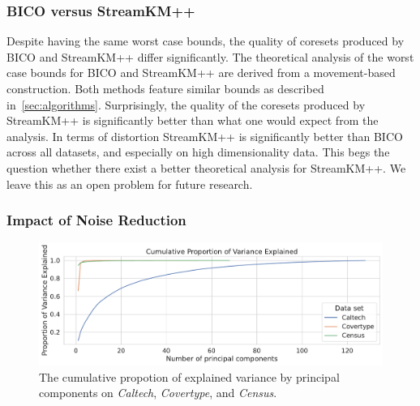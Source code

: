 \subsubsection*{BICO versus StreamKM++}
Despite having the same worst case bounds, the quality of coresets produced by BICO and StreamKM++ differ significantly.
The theoretical analysis of the worst case bounds for BICO and StreamKM++ are derived from a movement-based construction. Both methods feature similar bounds as described in~\cref{sec:algorithms}. Surprisingly, the quality of the coresets produced by StreamKM++ is significantly better than what one would expect from the analysis. In terms of distortion StreamKM++ is significantly better than BICO across all datasets, and especially on high dimensionality data. This begs the question whether there exist a better theoretical analysis for StreamKM++. We leave this as an open problem for future research.



\subsubsection*{Impact of Noise Reduction}

\begin{figure}
  \caption{The cumulative propotion of explained variance by principal components on \textit{Caltech}, \textit{Covertype}, and \textit{Census}.}
  \label{fig:explained-variance-pca}
  \includegraphics[width=1\linewidth]{figures/explained-variance-plot.pdf}
\end{figure}

